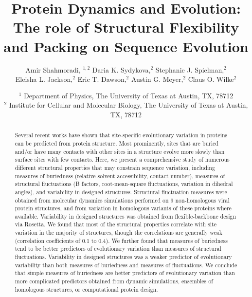 \documentclass[preprint,12pt]{article}
\begin{document}
\begin{titlepage}
    \title{Protein Dynamics and Evolution: The role of Structural Flexibility and Packing on Sequence Evolution}
    \author{Amir Shahmoradi, $^{1,2}$ %
            Daria K. Sydykova,$^{2}$ Stephanie J. Spielman,$^{2}$ \\
            Eleisha L. Jackson,$^{2}$ Eric T. Dawson,$^{2}$ Austin G. Meyer,$^{2}$ Claus O. Wilke$^{2}$}

    \date{\small $^1$ Department of Physics, The University of Texas at Austin, TX, 78712 \\
                 $^2$ Institute for Cellular and Molecular Biology, The University of Texas at Austin, TX, 78712 \\ }

    \maketitle

    \begin{abstract}
        Several recent works have shown that site-specific evolutionary variation in proteins can be predicted from protein structure. Most prominently, sites that are buried and/or have many contacts with other sites in a structure evolve more slowly than surface sites with few contacts. Here, we present a comprehensive study of numerous different structural properties that may constrain sequence variation, including measures of buriedness (relative solvent accessibility, contact number), measures of structural fluctuations (B factors, root-mean-square fluctuations, variation in dihedral angles), and variability in designed structures. Structural fluctuation measures were obtained from molecular dynamics simulations performed on 9 non-homologous viral protein structures, and from variation in homologous variants of these proteins where available. Variability in designed structures was obtained from flexible-backbone design via Rosetta. We found that most of the structural properties correlate with site variation in the majority of structures, though the correlations are generally weak (correlation coefficients of 0.1 to 0.4). We further found that measures of buriedness tend to be better predictors of evolutionary variation than measures of structural fluctuations. Variability in designed structures was a weaker predictor of evolutionary variability than both measures of buriedness and measures of fluctuations. We conclude that simple measures of buriedness are better predictors of evolutionary variation than more complicated predictors obtained from dynamic simulations, ensembles of homologous structures, or computational protein design.
    \end{abstract}
\end{titlepage}
\end{document}
